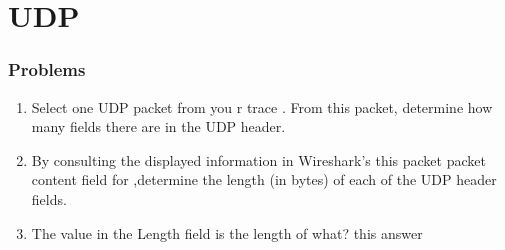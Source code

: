 \section{UDP}
    \subsubsection*{Problems}
    \begin{enumerate}[label=\bfseries Problem \arabic*:,leftmargin=*,labelindent=1em]
        \item Select one UDP packet from you r trace . From this packet, determine how many fields there are in the UDP header.\\[0.2mm]
        \soln
        \item By consulting the displayed information in Wireshark’s this packet packet content field for ,determine the length (in bytes) of each of the UDP header fields.\\[0.2mm]
        \soln
        \item The value in the Length field is the length of what? this answer\\[0.2mm]
        \soln

\end{enumerate}
